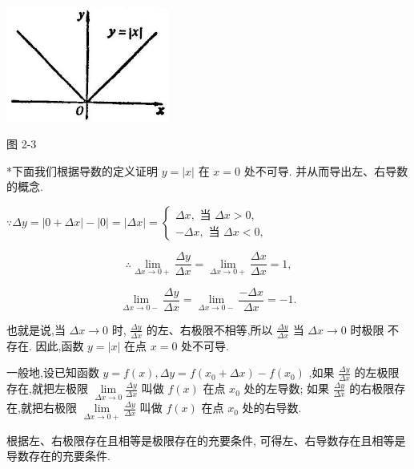 \documentclass[lang=cn,newtx,10pt,scheme=chinese]{elegantbook}
\begin{document}
\begin{center}
\includegraphics[max width=0.4\textwidth]{images/01912c18-5c3f-733d-b775-749ba9897a9d_69_933568.jpg}
\end{center}

图 2-3

*下面我们根据导数的定义证明 \(y = \left| x\right|\) 在 \(x = 0\) 处不可导. 并从而导出左、右导数的概念.

\(\because {\Delta y} = \left| {0 + {\Delta x}}\right| - \left| 0\right| = \left| {\Delta x}\right| = \left\{ \begin{array}{r} {\Delta x},\text{ 当 }{\Delta x} > 0, \\ - {\Delta x},\text{ 当 }{\Delta x} < 0, \end{array}\right.\)

\[
\therefore \mathop{\lim }\limits_{{{\Delta x} \rightarrow 0 + }}\frac{\Delta y}{\Delta x} = \mathop{\lim }\limits_{{{\Delta x} \rightarrow 0 + }}\frac{\Delta x}{\Delta x} = 1\text{,}
\]

\[
\mathop{\lim }\limits_{{{\Delta x} \rightarrow 0 - }}\frac{\Delta y}{\Delta x} = \mathop{\lim }\limits_{{{\Delta x} \rightarrow 0 - }}\frac{-{\Delta x}}{\Delta x} = - 1.
\]

也就是说,当 \({\Delta x} \rightarrow 0\) 时, \(\frac{\Delta y}{\Delta x}\) 的左、右极限不相等,所以 \(\frac{\Delta y}{\Delta x}\) 当 \({\Delta x} \rightarrow 0\) 时极限 不存在. 因此,函数 \(y = \left| x\right|\) 在点 \(x = 0\) 处不可导.

一般地,设已知函数 \(y = f\left( x\right) ,{\Delta y} = f\left( {{x}_{0} + {\Delta x}}\right) - f\left( {x}_{0}\right)\) ,如果 \(\frac{\Delta y}{\Delta x}\) 的左极限存在,就把左极限 \(\mathop{\lim }\limits_{{{\Delta x} \rightarrow 0}}\frac{\Delta y}{\Delta x}\) 叫做 \(f\left( x\right)\) 在点 \({x}_{0}\) 处的左导数; 如果 \(\frac{\Delta y}{\Delta x}\) 的右极限存在,就把右极限 \(\mathop{\lim }\limits_{{{\Delta x} \rightarrow 0 + }}\frac{\Delta y}{\Delta x}\) 叫做 \(f\left( x\right)\) 在点 \({x}_{0}\) 处的右导数.

根据左、右极限存在且相等是极限存在的充要条件, 可得左、右导数存在且相等是导数存在的充要条件.
\end{document}
